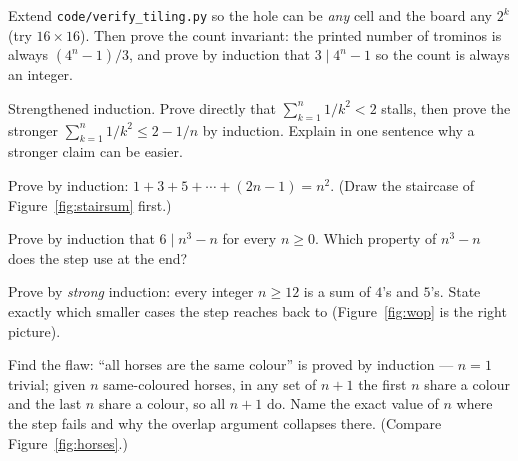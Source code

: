 \begin{exercise}[hard]
Extend \texttt{code/verify\_tiling.py} so the hole can be \emph{any} cell and
the board any $2^k$ (try $16 \times 16$). Then prove the count invariant:
the printed number of trominos is always $(4^n - 1)/3$, and prove by
induction that $3 \mid 4^n - 1$ so the count is always an integer.
\end{exercise}
\begin{exercise}[hard]
Strengthened induction. Prove directly that $\sum_{k=1}^{n} 1/k^2 < 2$
stalls, then prove the stronger $\sum_{k=1}^{n} 1/k^2 \le 2 - 1/n$ by
induction. Explain in one sentence why a stronger claim can be easier.
\end{exercise}
\begin{exercise}[easy]
Prove by induction: $1 + 3 + 5 + \cdots + (2n-1) = n^2$. (Draw the
staircase of Figure~\ref{fig:stairsum} first.)
\end{exercise}
\begin{exercise}[medium]
Prove by induction that $6 \mid n^3 - n$ for every $n \ge 0$. Which
property of $n^3 - n$ does the step use at the end?
\end{exercise}
\begin{exercise}[medium]
Prove by \emph{strong} induction: every integer $n \ge 12$ is a sum of
$4$'s and $5$'s. State exactly which smaller cases the step reaches back
to (Figure~\ref{fig:wop} is the right picture).
\end{exercise}
\begin{exercise}[hard]
Find the flaw: ``all horses are the same colour'' is proved by induction
--- $n=1$ trivial; given $n$ same-coloured horses, in any set of $n{+}1$
the first $n$ share a colour and the last $n$ share a colour, so all
$n{+}1$ do. Name the exact value of $n$ where the step fails and why
the overlap argument collapses there. (Compare Figure~\ref{fig:horses}.)
\end{exercise}


